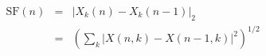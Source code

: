 \documentclass{article}
\begin{document}
 
\begin{eqnarray*}
\mbox{SF}(n) & = & \left| X_k(n) - X_k(n-1) \right|_2 \\
   & =  & \left( \sum_k |X(n,k) - X(n-1,k)|^2 \right)^{1/2}
\end{eqnarray*}
 \newpage 
\end{document}
